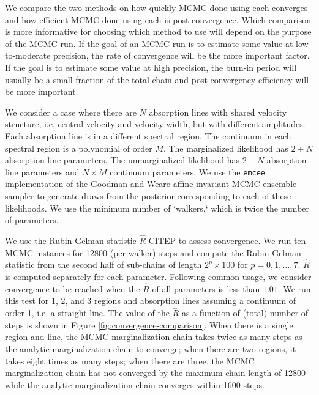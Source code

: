 \documentclass[manuscript]{aastex62}
\begin{document}
We compare the two methods on how quickly MCMC done using each converges and how efficient MCMC done using each is post-convergence.
Which comparison is more informative for choosing which method to use will depend on the purpose of the MCMC run.
If the goal of an MCMC run is to estimate some value at low-to-moderate precision, the rate of convergence will be the more important factor.
If the goal is to estimate some value at high precision, the burn-in period will usually be a small fraction of the total chain and post-convergency efficiency will be more important.

We consider a case where there are $N$ absorption lines with shared velocity structure, i.e. central velocity and velocity width, but with different amplitudes.
Each absorption line is in a different spectral region.
The continuum in each spectral region is a polynomial of order $M$.
The marginalized likelihood has $2 + N$ absorption line parameters.
The unmarginalized likelihood has $2 + N$ absorption line parameters and $N \times M$ continuum parameters.
We use the \texttt{emcee} implementation of the Goodman and Weare affine-invariant MCMC ensemble sampler to generate draws from the posterior corresponding to each of these likelihoods.
We use the minimum number of `walkers,` which is twice the number of parameters.


We use the Rubin-Gelman statistic $\hat{R}$ CITEP to assess convergence.
We run ten MCMC instances for 12800 (per-walker) steps and compute the Rubin-Gelman statistic from the second half of sub-chains of length $2^p \times 100$ for $p=0, 1, \ldots, 7$.
$\hat{R}$ is computed separately for each parameter.
Following common usage, we consider convergence to be reached when the $\hat{R}$ of all parameters is less than $1.01$.
We run this test for 1, 2, and 3 regions and absorption lines assuming a continuum of order 1, i.e. a straight line.
The value of the $\hat{R}$ as a function of (total) number of steps is shown in Figure \ref{fig:convergence-comparison}.
When there is a single region and line, the MCMC marginalization chain takes twice as many steps as the analytic marginalization chain to converge; when there are two regions, it takes eight times as many steps; when there are three, the MCMC marginalization  chain has not converged by the maximum chain length of 12800 while the analytic marginalization chain converges within 1600 steps.
\end{document}

